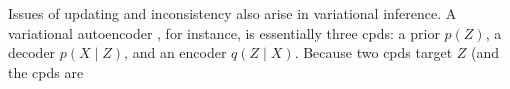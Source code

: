 \documentclass[letterpaper]{article} %
\theoremstyle{plain}
\theoremstyle{definition}
\theoremstyle{remark}
\begin{document}
%
Issues of updating and inconsistency also arise in
variational inference. A  
variational autoencoder \cite{kingma2013autoencoding}, for instance, 
is essentially three cpds: a prior $p(Z)$, a decoder $p(X \!\mid\! Z)$, and 
an encoder $q(Z \!\mid\! X)$. Because two cpds target $Z$ (and the cpds are 
\end{document}
